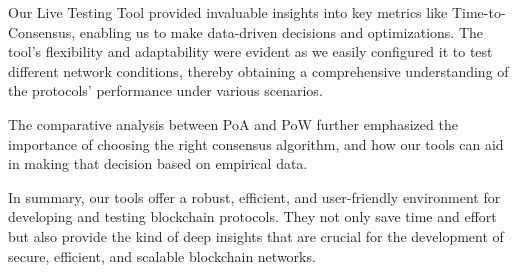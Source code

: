 Our Live Testing Tool provided invaluable insights into key metrics like Time-to-Consensus, enabling us to make data-driven decisions and optimizations. The tool's flexibility and adaptability were evident as we easily configured it to test different network conditions, thereby obtaining a comprehensive understanding of the protocols' performance under various scenarios.

The comparative analysis between PoA and PoW further emphasized the importance of choosing the right consensus algorithm, and how our tools can aid in making that decision based on empirical data.

In summary, our tools offer a robust, efficient, and user-friendly environment for developing and testing blockchain protocols. They not only save time and effort but also provide the kind of deep insights that are crucial for the development of secure, efficient, and scalable blockchain networks.

